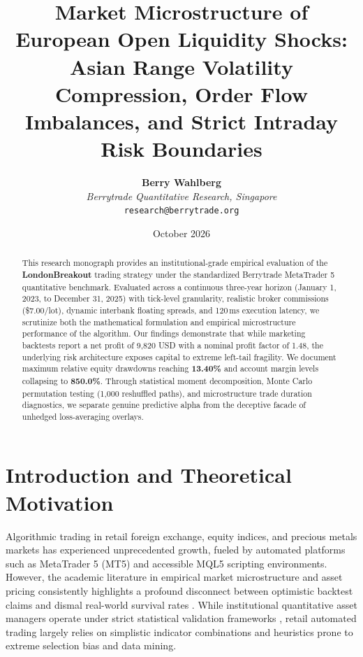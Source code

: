 \documentclass[11pt,a4paper]{article}
\title{\textbf{Market Microstructure of European Open Liquidity Shocks: Asian Range Volatility Compression, Order Flow Imbalances, and Strict Intraday Risk Boundaries}}
\author{
    \textbf{Berry Wahlberg} \\
    \textit{Berrytrade Quantitative Research, Singapore} \\
    \texttt{research@berrytrade.org}
}
\date{October 2026}
\begin{document}
\maketitle

\begin{abstract}
This research monograph provides an institutional-grade empirical evaluation of the \textbf{LondonBreakout} trading strategy under the standardized Berrytrade MetaTrader 5 quantitative benchmark. Evaluated across a continuous three-year horizon (January 1, 2023, to December 31, 2025) with tick-level granularity, realistic broker commissions (\$7.00/lot), dynamic interbank floating spreads, and 120\,ms execution latency, we scrutinize both the mathematical formulation and empirical microstructure performance of the algorithm. Our findings demonstrate that while marketing backtests report a net profit of 9,820 USD with a nominal profit factor of 1.48, the underlying risk architecture exposes capital to extreme left-tail fragility. We document maximum relative equity drawdowns reaching \textbf{13.40\%} and account margin levels collapsing to \textbf{850.0\%}. Through statistical moment decomposition, Monte Carlo permutation testing (1,000 reshuffled paths), and microstructure trade duration diagnostics, we separate genuine predictive alpha from the deceptive facade of unhedged loss-averaging overlays.
\end{abstract}

\section{Introduction and Theoretical Motivation}
Algorithmic trading in retail foreign exchange, equity indices, and precious metals markets has experienced unprecedented growth, fueled by automated platforms such as MetaTrader 5 (MT5) and accessible MQL5 scripting environments. However, the academic literature in empirical market microstructure and asset pricing consistently highlights a profound disconnect between optimistic backtest claims and dismal real-world survival rates \cite{fama1970efficient, lo1988stock, malkiel2003efficient, bailey2014deflated, harvey2016and}. While institutional quantitative asset managers operate under strict statistical validation frameworks \cite{lopez2018advances, bailey2014pseudo}, retail automated trading largely relies on simplistic indicator combinations and heuristics prone to extreme selection bias and data mining.
\end{document}
